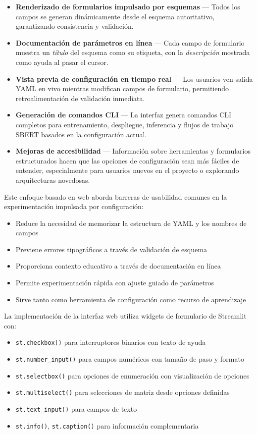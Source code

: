 \documentclass[11pt,a4paper]{article}
\begin{document}
\begin{itemize}[leftmargin=*]
    \item \textbf{Renderizado de formularios impulsado por esquemas} --- Todos los campos se generan dinámicamente desde el esquema autoritativo, garantizando consistencia y validación.
    \item \textbf{Documentación de parámetros en línea} --- Cada campo de formulario muestra un \emph{título} del esquema como su etiqueta, con la \emph{descripción} mostrada como ayuda al pasar el cursor.
    \item \textbf{Vista previa de configuración en tiempo real} --- Los usuarios ven salida YAML en vivo mientras modifican campos de formulario, permitiendo retroalimentación de validación inmediata.
    \item \textbf{Generación de comandos CLI} --- La interfaz genera comandos CLI completos para entrenamiento, despliegue, inferencia y flujos de trabajo SBERT basados en la configuración actual.
    \item \textbf{Mejoras de accesibilidad} --- Información sobre herramientas y formularios estructurados hacen que las opciones de configuración sean más fáciles de entender, especialmente para usuarios nuevos en el proyecto o explorando arquitecturas novedosas.
\end{itemize}

Este enfoque basado en web aborda barreras de usabilidad comunes en la experimentación impulsada por configuración:
\begin{itemize}[leftmargin=*]
    \item Reduce la necesidad de memorizar la estructura de YAML y los nombres de campos
    \item Previene errores tipográficos a través de validación de esquema
    \item Proporciona contexto educativo a través de documentación en línea
    \item Permite experimentación rápida con ajuste guiado de parámetros
    \item Sirve tanto como herramienta de configuración como recurso de aprendizaje
\end{itemize}

La implementación de la interfaz web utiliza widgets de formulario de Streamlit con:
\begin{itemize}[leftmargin=*]
    \item \texttt{st.checkbox()} para interruptores binarios con texto de ayuda
    \item \texttt{st.number\_input()} para campos numéricos con tamaño de paso y formato
    \item \texttt{st.selectbox()} para opciones de enumeración con visualización de opciones
    \item \texttt{st.multiselect()} para selecciones de matriz desde opciones definidas
    \item \texttt{st.text\_input()} para campos de texto
    \item \texttt{st.info()}, \texttt{st.caption()} para información complementaria
\end{itemize}
\end{document}

